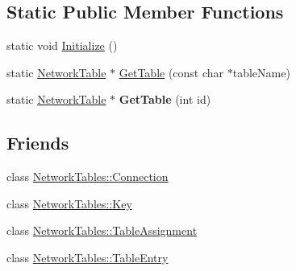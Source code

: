 \subsection*{Static Public Member Functions}
\begin{DoxyCompactItemize}
\item 
static void \hyperlink{classNetworkTable_a333b5dd0e5cedf562eb64b1d34053954}{Initialize} ()
\item 
static \hyperlink{classNetworkTable}{NetworkTable} $\ast$ \hyperlink{classNetworkTable_ab4df628cbe15e2a4fcc49e3393239f9b}{GetTable} (const char $\ast$tableName)
\item 
\hypertarget{classNetworkTable_a960c4b62fb40a99dd8498f49ee6144d7}{
static \hyperlink{classNetworkTable}{NetworkTable} $\ast$ {\bfseries GetTable} (int id)}
\label{classNetworkTable_a960c4b62fb40a99dd8498f49ee6144d7}

\end{DoxyCompactItemize}
\subsection*{Friends}
\begin{DoxyCompactItemize}
\item 
\hypertarget{classNetworkTable_a3c88fc4701008243e251a4f7eace851b}{
class \hyperlink{classNetworkTable_a3c88fc4701008243e251a4f7eace851b}{NetworkTables::Connection}}
\label{classNetworkTable_a3c88fc4701008243e251a4f7eace851b}

\item 
\hypertarget{classNetworkTable_a8f69679fff9c3d64107b7cd01e8b5f92}{
class \hyperlink{classNetworkTable_a8f69679fff9c3d64107b7cd01e8b5f92}{NetworkTables::Key}}
\label{classNetworkTable_a8f69679fff9c3d64107b7cd01e8b5f92}

\item 
\hypertarget{classNetworkTable_afc95a13a99e18835a61aac3c99d5de24}{
class \hyperlink{classNetworkTable_afc95a13a99e18835a61aac3c99d5de24}{NetworkTables::TableAssignment}}
\label{classNetworkTable_afc95a13a99e18835a61aac3c99d5de24}

\item 
\hypertarget{classNetworkTable_a5e5f00607e5a3a7ecadc12a77e91e6a4}{
class \hyperlink{classNetworkTable_a5e5f00607e5a3a7ecadc12a77e91e6a4}{NetworkTables::TableEntry}}
\label{classNetworkTable_a5e5f00607e5a3a7ecadc12a77e91e6a4}

\end{DoxyCompactItemize}


